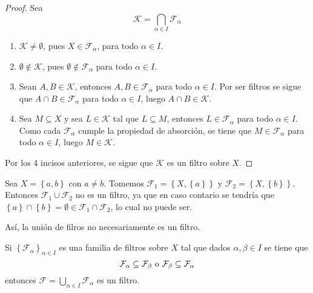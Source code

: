 \documentclass[12pt]{report}
\theoremstyle{largebreak}
\begin{document}
    \begin{proof}
        Sea
        \begin{equation*}
            \mathcal{K}=\bigcap_{\alpha\in I}\mathcal{F}_\alpha
        \end{equation*}
        \begin{enumerate}
            \item $\mathcal{K}\neq\emptyset$, pues $X\in\mathcal{F}_\alpha$, para todo $\alpha\in I$.
            \item $\emptyset\notin\mathcal{K}$, pues $\emptyset\notin\mathcal{F}_\alpha$ para todo $\alpha\in I$.
            \item Sean $A,B\in\mathcal{K}$, entonces $A,B\in\mathcal{F}_\alpha$ para todo $\alpha\in I$. Por ser filtros se sigue que $A\cap B\in\mathcal{F}_\alpha$ para todo $\alpha\in I$, luego $A\cap B\in\mathcal{K}$.
            \item Sea $M\subseteq X$ y sea $L\in\mathcal{K}$ tal que $L\subseteq M$, entonces $L\in\mathcal{F}_\alpha$ para todo $\alpha\in I$. Como cada $\mathcal{F}_\alpha$ cumple la propiedad de absorción, se tiene que $M\in\mathcal{F}_\alpha$ para todo $\alpha\in I$, luego $M\in\mathcal{K}$.
        \end{enumerate}
        Por los 4 incisos anteriores, se sigue que $\mathcal{K}$ es un filtro sobre $X$.
    \end{proof}

    \begin{exa}
        Sea $X=\left\{a,b \right\}$ con $a\neq b$. Tomemos $\mathcal{F}_1=\left\{X,\left\{ a\right\} \right\}$ y $\mathcal{F}_2=\left\{X,\left\{ b\right\} \right\}$. Entonces $\mathcal{F}_1\cup\mathcal{F}_2$ no es un filtro, ya que en caso contario se tendría que $\left\{a \right\}\cap\left\{b \right\}=\emptyset\in\mathcal{F}_1\cap\mathcal{F}_2$, lo cual no puede ser.

        Así, la unión de filros no necesariamente es un filtro.
    \end{exa}

    \begin{propo}
        Si $\left\{\mathcal{F}_\alpha \right\}_{\alpha\in I}$ es una familia de filtros sobre $X$ tal que dados $\alpha,\beta\in I$ se tiene que
        \begin{equation*}
            \mathcal{F}_\alpha\subseteq\mathcal{F}_\beta\textup{ o }\mathcal{F}_\beta\subseteq\mathcal{F}_\alpha
        \end{equation*}
        entonces $\mathcal{F}=\bigcup_{\alpha\in I}\mathcal{F}_\alpha$ es un filtro.
    \end{propo}
\end{document}

